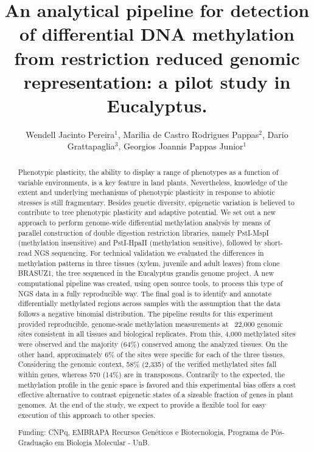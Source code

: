 \documentclass[twoside]{article}
\title{\vspace{-15mm}\fontsize{24pt}{10pt}\selectfont\textbf{An analytical pipeline for detection of differential DNA methylation from restriction reduced genomic representation: a pilot study in Eucalyptus.}} %
\author{Wendell Jacinto Pereira$^1$, Marilia de Castro Rodrigues Pappas$^2$, Dario Grattapaglia$^3$, Georgios Joannis Pappas Junior$^1$}
\affil{1 DEPARTAMENTO DE BIOLOGIA CELULAR, INSTITUTO DE CI\^ENCIAS BIOL\'OGICAS, UNB\\ 2 EMBRAPA RECURSOS GEN\'ETICOS E BIOTECNOLOGIA\\ 3 EMBRAPA RECURSOS GEN\'ETICOS E BIOTECNOLOGIA, UNIVERSIDADE CAT\'OLICA DE BRAS\'ILIA.\\ }
\date{}
\begin{document}
\maketitle %

\thispagestyle{fancy} %


\begin{abstract}
Phenotypic plasticity, the ability to display a range of phenotypes as a function of variable environments, is a key feature in land plants. Nevertheless, knowledge of the extent and underlying mechanisms of phenotypic plasticity in response to abiotic stresses is still fragmentary. Besides genetic diversity, epigenetic variation is believed to contribute to tree phenotypic plasticity and adaptive potential. We set out a new approach to perform genome-wide differential methylation analysis by means of parallel construction of double digestion restriction libraries, namely PstI-MspI (methylation insensitive) and PstI-HpaII (methylation sensitive), followed by short-read NGS sequencing. For technical validation we evaluated the differences in methylation patterns in three tissues (xylem, juvenile and adult leaves) from clone BRASUZ1, the tree sequenced in the Eucalyptus grandis genome project. A new computational pipeline was created, using open source tools, to process this type of NGS data in a fully reproducible way. The final goal is to identify and annotate differentially methylated regions across samples with the assumption that the data follows a negative binomial distribution. The pipeline results for this experiment provided reproducible, genome-scale methylation measurements at ~22,000 genomic sites consistent in all tissues and biological replicates. From this, 4,000 methylated sites were observed and the majority (64\%) conserved among the analyzed tissues. On the other hand, approximately 6\% of the sites were specific for each of the three tissues. Considering the genomic context, 58\% (2,335) of the verified methylated sites fall within genes, whereas 570 (14\%) are in transposons. Contrarily to the expected, the methylation profile in the genic space is favored and this experimental bias offers a cost effective alternative to contrast epigenetic states of a sizeable fraction of genes in plant genomes. At the end of the study, we expect to provide a flexible tool for easy execution of this approach to other species.

Funding: CNPq, EMBRAPA Recursos Gen\'eticos e Biotecnologia, Programa de P\'os-Gradua\c{c}\~ao em Biologia Molecular - UnB.
\end{abstract}
\end{document}

